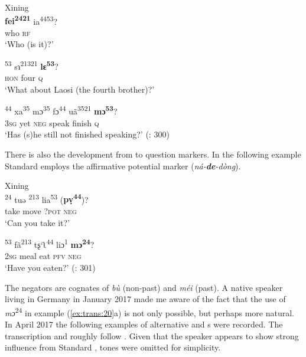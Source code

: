 \ea%
    \label{ex:trans:19}
    Xining \\
    \ea
    \gll \textbf{{fei}}\textbf{\textsuperscript{2421}}  {ia}\textsuperscript{4453}?\\
    who  \textsc{rf}\\
    \glt ‘Who (is it)?’
    
    \ex
    \textsuperscript{53}  {sɿ}\textsuperscript{21321}  \textbf{{lɛ}}\textbf{\textsuperscript{53}}?\\
    \textsc{hon}  four  \textsc{q}\\
    \glt ‘What about Laosi (the fourth brother)?’
    
    \ex
    \textsuperscript{44}  {xa}\textsuperscript{35}  {mɔ}\textsuperscript{35}  {fɔ}\textsuperscript{44}  {uã}\textsuperscript{3521} \textbf{{mɔ}}\textbf{\textsuperscript{53}}?\\
    3\textsc{sg}  yet  \textsc{neg}  speak  finish    \textsc{q}\\
    \glt ‘Has (s)he still not finished speaking?’ (\citealt{ZhangChengzai1980}: 300)\z\z

There is also the development from  to question markers. In the following example Standard  employs the affirmative potential marker (\textit{ná-}\textbf{\textit{de}}\textit{-dòng}).

\ea%
    \label{ex:trans:20}
    Xining \\
    \ea
    \textsuperscript{24}  {tuə} \textsuperscript{213}  {lia}\textsuperscript{53}  (\textbf{{pṿ}}\textbf{\textsuperscript{44}})?\\
    take  move  \textsc{?pot}  \textsc{neg}\\
    \glt ‘Can you take it?’
    
    \ex
    \textsuperscript{53}  {fã}\textsuperscript{213}  {tʂ‘ʅ}\textsuperscript{44}  {liɔ}\textsuperscript{1}  \textbf{{mɔ}}\textbf{\textsuperscript{24}}?\\
    2\textsc{sg}  meal  eat  \textsc{pfv}  \textsc{neg}\\
    \glt ‘Have you eaten?’ (\citealt{ZhangChengzai1980}: 301)
    \z
    \z

The negators are cognates of  \textit{bù}  (non-past) and \textit{méi}  (past). A native speaker living in Germany in January 2017 made me aware of the fact that the use of \textit{mɔ}\textsuperscript{24} in example (\ref{ex:trans:20}a) is not only possible, but perhaps more natural. In April 2017 the following examples of alternative and s were recorded. The transcription and  roughly follow \citet{ZhangChengzai1980}. Given that the speaker appears to show strong influence from Standard , tones were omitted for simplicity.

